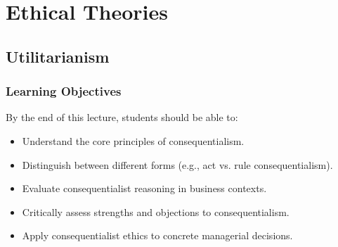 \documentclass[aspectratio=169, 10pt]{beamer}
\begin{document}
\section{Ethical Theories}



\subsection{Utilitarianism}



\begin{frame}
\frametitle{Learning Objectives}
 By the end of this lecture, students should be able to:
\begin{itemize}
\item Understand the core principles of consequentialism.
\item Distinguish between different forms (e.g., act vs. rule consequentialism).
\item Evaluate consequentialist reasoning in business contexts.
\item Critically assess strengths and objections to consequentialism.
\item Apply consequentialist ethics to concrete managerial decisions.
\end{itemize}
\end{frame}
\end{document}
